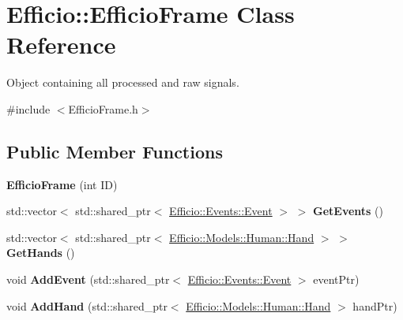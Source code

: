 \hypertarget{class_efficio_1_1_efficio_frame}{}\section{Efficio\+:\+:Efficio\+Frame Class Reference}
\label{class_efficio_1_1_efficio_frame}


Object containing all processed and raw signals.  




{\ttfamily \#include $<$Efficio\+Frame.\+h$>$}

\subsection*{Public Member Functions}
\begin{DoxyCompactItemize}
\item 
{\bfseries Efficio\+Frame} (int ID)\hypertarget{class_efficio_1_1_efficio_frame_a9b49dc8882fa2c58ebcd8710bb14de91}{}\label{class_efficio_1_1_efficio_frame_a9b49dc8882fa2c58ebcd8710bb14de91}

\item 
std\+::vector$<$ std\+::shared\+\_\+ptr$<$ \hyperlink{class_efficio_1_1_events_1_1_event}{Efficio\+::\+Events\+::\+Event} $>$ $>$ {\bfseries Get\+Events} ()\hypertarget{class_efficio_1_1_efficio_frame_a219e88c37091c04515e7022c65300654}{}\label{class_efficio_1_1_efficio_frame_a219e88c37091c04515e7022c65300654}

\item 
std\+::vector$<$ std\+::shared\+\_\+ptr$<$ \hyperlink{class_efficio_1_1_models_1_1_human_1_1_hand}{Efficio\+::\+Models\+::\+Human\+::\+Hand} $>$ $>$ {\bfseries Get\+Hands} ()\hypertarget{class_efficio_1_1_efficio_frame_a2d6b1d6242890666e52a9d09bca6d610}{}\label{class_efficio_1_1_efficio_frame_a2d6b1d6242890666e52a9d09bca6d610}

\item 
void {\bfseries Add\+Event} (std\+::shared\+\_\+ptr$<$ \hyperlink{class_efficio_1_1_events_1_1_event}{Efficio\+::\+Events\+::\+Event} $>$ event\+Ptr)\hypertarget{class_efficio_1_1_efficio_frame_a2a50c673ea34e5d85707a55099ebae63}{}\label{class_efficio_1_1_efficio_frame_a2a50c673ea34e5d85707a55099ebae63}

\item 
void {\bfseries Add\+Hand} (std\+::shared\+\_\+ptr$<$ \hyperlink{class_efficio_1_1_models_1_1_human_1_1_hand}{Efficio\+::\+Models\+::\+Human\+::\+Hand} $>$ hand\+Ptr)\hypertarget{class_efficio_1_1_efficio_frame_aa8aba8a6ee0efc3194b9a9065b932fb2}{}\label{class_efficio_1_1_efficio_frame_aa8aba8a6ee0efc3194b9a9065b932fb2}

\end{DoxyCompactItemize}
